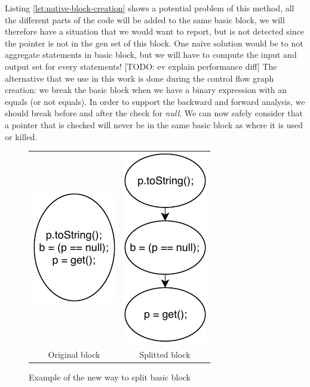 Listing \ref{lst:native-block-creation} shows a potential problem of this method, all the different parts of the code will be added to the same basic block, we will therefore have a situation that we would want to report, but is not detected since the pointer is not in the gen set of this block. 
One naive solution would be to not aggregate statements in basic block, but we will have to compute the input and output set for every statements! [TODO: ev explain performance diff]
The alternative that we use in this work is done during the control flow graph creation: we break the basic block when we have a binary expression with an equals (or not equals). 
In order to support the backward and forward analysis, we should break before and after the check for \emph{null}. 
We can now safely consider that a pointer that is checked will never be in the same basic block as where it is used or killed.
\begin{figure}[h]
\caption{Example of the new way to split basic block}
\label{figure:new-way-to-split}
\setlength{\tabcolsep}{24pt}
	\begin{tabular}{cc}
		\includegraphics[]{figure/original-block-cfg.pdf}  &
		\includegraphics[]{figure/splitted-block-cfg.pdf}   \\ 
		Original block & Splitted block
	\end{tabular}
\end{figure}

